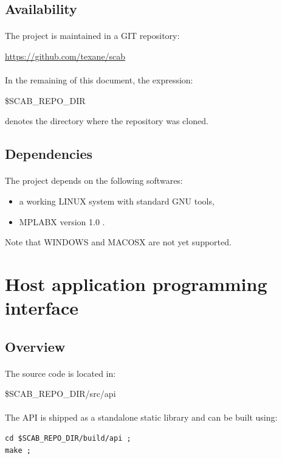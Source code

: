 \documentclass[a4paper, 11pt]{article}
\begin{document}
\subsection{Availability}
\paragraph{}
The project is maintained in a GIT repository:
\begin{center}
\url{https://github.com/texane/scab}
\end{center}
\paragraph{}
In the remaining of this document, the expression:
\begin{center}
\$SCAB\_REPO\_DIR
\end{center}
denotes the directory where the repository was cloned.

\subsection{Dependencies}
\paragraph{}
The project depends on the following softwares:
\begin{itemize}
\item a working LINUX system with standard GNU tools,
\item MPLABX version 1.0 .
\end{itemize}
Note that WINDOWS and MACOSX are not yet supported.


\newpage
\section{Host application programming interface}

\subsection{Overview}
\paragraph{}
The source code is located in:
\begin{center}
\$SCAB\_REPO\_DIR/src/api
\end{center}

\paragraph{}
The API is shipped as a standalone static library and can be built using:\\
\begin{small}
\lstset{language=C}
\begin{lstlisting}[frame=tb]
cd $SCAB_REPO_DIR/build/api ;
make ;
\end{lstlisting}
\end{small}
\end{document}
